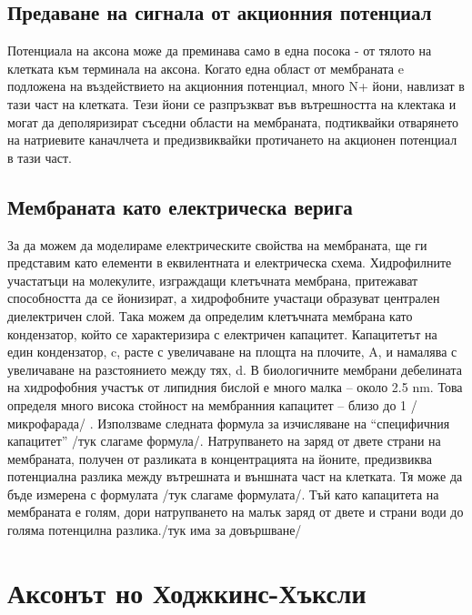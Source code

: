 \documentclass{article}
\begin{document}
\vspace{5mm} %
\subsection{Предаване на сигнала от акционния потенциал}

Потенциала на аксона може да преминава само в една посока - от тялото на клетката към терминала на аксона. Когато една област от мембраната e подложена на въздействието на акционния потенциал, много N+ йони, навлизат в тази част на клетката. Тези йони се разпръзкват във вътрешността на клектака и могат да деполяризират съседни области на мембраната, подтиквайки отварянето на натриевите каначлчета и предизвиквайки протичането на акционен потенциал в тази част.

\vspace{5mm} %
\subsection{Мембраната като електрическа верига}

За да можем да моделираме електрическите свойства на мембраната, ще ги представим като елементи в еквилентната и електрическа схема. Хидрофилните участатъци на молекулите, изграждащи клетъчната мембрана, притежават способността да се йонизират, а хидрофобните участаци образуват централен диелектричен слой. Така можем да определим клетъчната мембрана като кондензатор, който се характеризира с електричен капацитет. Капацитетът на един кондензатор, c, расте с увеличаване на площта на плочите, A, и намалява с увеличаване на разстоянието между тях, d. В биологичните мембрани дебелината на хидрофобния участък от липидния бислой е много малка – около 2.5 nm. Това определя много висока стойност на мембранния капацитет – близо до 1 /микрофарада/ .  Използваме следната формула за изчисляване на “специфичния капацитет” /тук слагаме формула/. Натрупването на заряд от двете страни на мембраната, получен от разликата в концентрацията на йоните, предизвиква потенциална разлика между вътрешната и външната част на клетката. Тя може да бъде измерена с формулата /тук слагаме формулата/. Тъй като капацитета на мембраната е голям, дори натрупването на малък заряд от двете и страни води до голяма потенцилна разлика./тук има за довършване/ 

\section{Аксонът но Ходжкинс-Хъксли}
\end{document}
